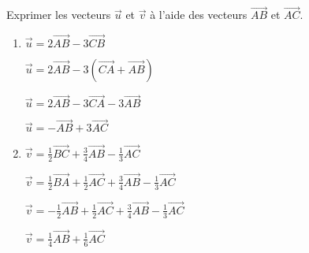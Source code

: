 
Exprimer les vecteurs $\vec{u}$ et $\vec{v}$ à l'aide des vecteurs $\overrightarrow{AB}$ et $\overrightarrow{AC}$.
\begin{enumerate}
\item $\vec{u}=2\overrightarrow{AB}-3\overrightarrow{CB}$

$\vec{u}=2\overrightarrow{AB}-3\left(\overrightarrow{CA}+\overrightarrow{AB}\right)$

$\vec{u}=2\overrightarrow{AB}-3\overrightarrow{CA}-3\overrightarrow{AB}$

$\vec{u}=-\overrightarrow{AB}+3\overrightarrow{AC}$



\item $\vec{v}=\frac{1}{2}\overrightarrow{BC}+ \frac{3}{4}\overrightarrow{AB}- \frac{1}{3}\overrightarrow{AC}$


$\vec{v}=\frac{1}{2}\overrightarrow{BA}+\frac{1}{2}\overrightarrow{AC}+ \frac{3}{4}\overrightarrow{AB}- \frac{1}{3}\overrightarrow{AC}$



$\vec{v}=-\frac{1}{2}\overrightarrow{AB}+\frac{1}{2}\overrightarrow{AC}+ \frac{3}{4}\overrightarrow{AB}- \frac{1}{3}\overrightarrow{AC}$


$\vec{v}=\frac{1}{4}\overrightarrow{AB}+\frac{1}{6}\overrightarrow{AC}$

\end{enumerate}